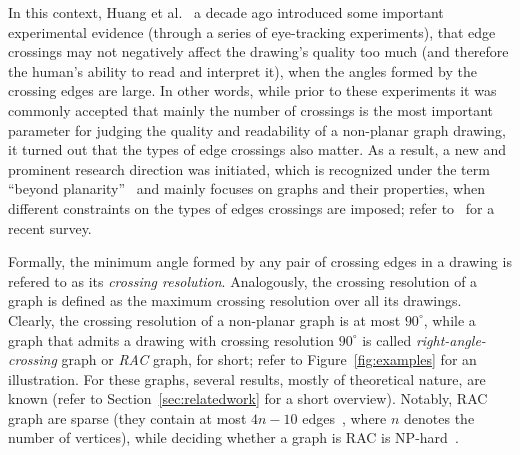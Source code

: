 \documentclass[runningheads]{llncs}
\begin{document}
In this context, Huang et al.~\cite{DBLP:conf/apvis/Huang07,DBLP:journals/vlc/HuangEH14} a decade ago introduced some important experimental evidence (through a series of eye-tracking experiments), that edge crossings may not negatively affect the drawing's quality too much (and therefore the human's ability to read and interpret it), when the angles formed by the crossing edges are large. In other words, while prior to these experiments it was commonly accepted that mainly the number of crossings is the most important parameter for judging the quality and readability of a non-planar graph drawing, it turned out that the types of edge crossings also matter. As a result, a new and prominent research direction was initiated, which is recognized under the term ``beyond planarity''~\cite{Shonan2016,Dagstuhl2016,SoCG2017} and mainly focuses on graphs and their properties, when different constraints on the types of edges crossings are imposed; refer to~\cite{DBLP:journals/corr/abs-1804-07257} for a recent survey. 

Formally, the minimum angle formed by any pair of crossing edges in a drawing is refered to as its \emph{crossing resolution}. Analogously, the crossing resolution of a graph is defined as the maximum crossing resolution over all its drawings. Clearly, the crossing resolution of a non-planar graph is at most $90^\circ$, while a graph that admits a drawing with crossing resolution $90^\circ$ is called \emph{right-angle-crossing} graph or \emph{RAC} graph, for short; refer to Figure~\ref{fig:examples} for an illustration. For these graphs, several results, mostly of theoretical nature, are known (refer to Section~\ref{sec:relatedwork} for a short overview). Notably, RAC graph are sparse (they contain at most $4n-10$ edges~\cite{DBLP:journals/tcs/DidimoEL11}, where $n$ denotes the number of  vertices), while deciding whether a graph is RAC is NP-hard~\cite{DBLP:journals/jgaa/ArgyriouBS12}.
\end{document}
